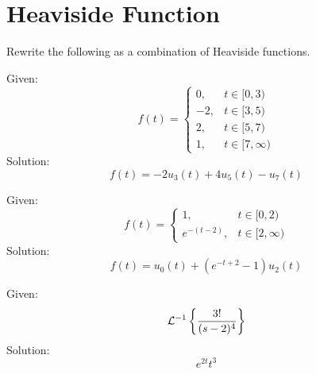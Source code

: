 \documentclass[diffeq.tex]{subfiles}
\begin{document}
\section{Heaviside Function}
Rewrite the following as a combination of Heaviside functions.
\begin{homework*}[263.5]
    Given:
    \begin{equation}
        f(t) = \begin{cases}
            0, &t\in[0,3)\\
            -2, &t\in[3,5)\\
            2, &t\in[5,7)\\
            1, &t\in[7,\infty)
        \end{cases}
    \end{equation}
    Solution:
    \begin{equation}
        f(t) = -2u_{3}(t) + 4u_{5}(t) - u_{7}(t)
    \end{equation}
\end{homework*}
\begin{homework*}[263.7]
    Given:
    \begin{equation}
        f(t) = \begin{cases}
            1, &t\in[0,2)\\
            e^{-(t-2)}, &t\in[2,\infty)
        \end{cases}
    \end{equation}
    Solution:
    \begin{equation}
        f(t) = u_{0}(t) + (e^{-t+2} - 1)u_{2}(t)
    \end{equation}
\end{homework*}
\begin{homework*}[263.13]
    Given:
    \begin{equation}
        \mathcal{L}^{-1}\left\{\frac{3!}{(s-2)^{4}}\right\}
    \end{equation}
    Solution:
    \begin{equation}
        e^{2t}t^{3}
    \end{equation}
\end{homework*}
\end{document}
